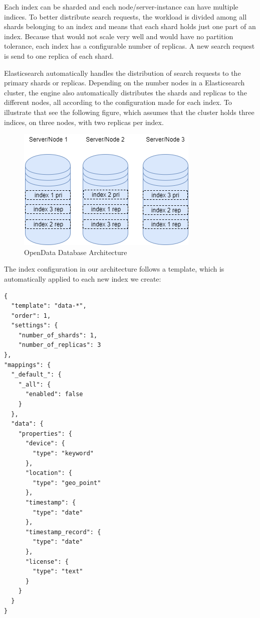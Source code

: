 Each index can be sharded and each node/server-instance can have
multiple indices. To better distribute search requests, the workload is
divided among all shards belonging to an index and means that each shard
holds just one part of an index. Because that would not scale very well
and would have no partition tolerance, each index has a configurable
number of replicas. A new search request is send to one replica of each
shard.

Elasticsearch automatically handles the distribution of search requests
to the primary shards or replicas. Depending on the number nodes in a
Elasticsearch cluster, the engine also automatically distributes the
shards and replicas to the different nodes, all according to the
configuration made for each index. To illustrate that see the following
figure, which assumes that the cluster holds three indices, on three
nodes, with two replicas per index.

\begin{figure}[htbp]
\centering
\includegraphics{images/07_database_architecture_elastic.png}
\caption{OpenData Database Architecture}
\end{figure}

The index configuration in our architecture follows a template, which is
automatically applied to each new index we create:

\begin{verbatim}
{
  "template": "data-*",
  "order": 1,
  "settings": {
    "number_of_shards": 1,
    "number_of_replicas": 3
},
"mappings": {
  "_default_": {
    "_all": {
      "enabled": false
    }
  },
  "data": {
    "properties": {
      "device": {
        "type": "keyword"
      },
      "location": {
        "type": "geo_point"
      },
      "timestamp": {
        "type": "date"
      },
      "timestamp_record": {
        "type": "date"
      },
      "license": {
        "type": "text"
      }
    }
  }
}
\end{verbatim}

